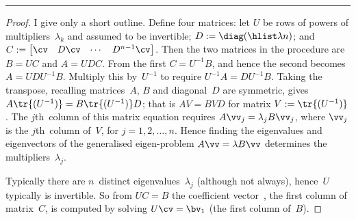 \begin{table}
\begin{minipage}{\linewidth}
\begin{itemize}
\end{itemize}
\end{minipage}
\hrule
\end{table}

\begin{proof} 
I give only a short outline.
Define four matrices: let \(U\) be rows of powers of multipliers~\(\lambda_k\) and assumed to be invertible; \(D:=\diag(\hlist\lambda n)\); and \(C:=\begin{bmatrix} \cv&D\cv&\cdots&D^{n-1}\cv \end{bmatrix}\).
Then the two matrices in the procedure are \(B=UC\) and \(A=UDC\).
From the first \(C=U^{-1}B\), and hence the second becomes \(A=UDU^{-1}B\). 
Multiply this by~\(U^{-1}\) to require \(U^{-1}A=DU^{-1}B\).
Taking the transpose, recalling matrices~\(A\), \(B\) and diagonal~\(D\) are symmetric, gives \(A\tr{(U^{-1})}=B\tr{(U^{-1})}D\); that is
\(AV=BVD\) for matrix \(V:=\tr{(U^{-1})}\).
The \(j\)th~column of this matrix equation requires \(A\vv_j=\lambda_jB\vv_j\), where \(\vv_j\) is the \(j\)th~column of~\(V\), for \(j=1,2,\ldots,n\).
Hence finding the eigenvalues and eigenvectors of the generalised eigen-problem \(A\vv=\lambda B\vv\) determines the multipliers~\(\lambda_j\).

Typically there are \(n\)~distinct eigenvalues~\(\lambda_j\) (although not always), hence~\(U\) typically is invertible. 
So from \(UC=B\) the coefficient vector~\cv, the first column of matrix~\(C\), is computed by solving \(U\cv=\bv_1\) (the first column of~\(B\)).
\end{proof}





